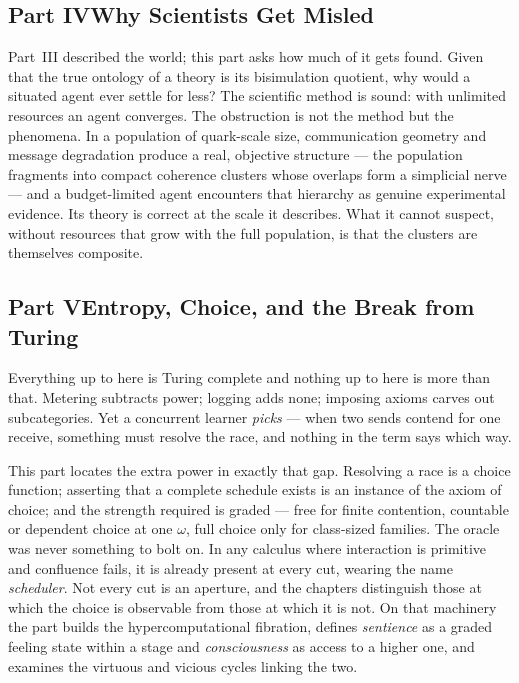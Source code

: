 \documentclass[12pt,openright,twoside]{book}
\theoremstyle{remark}
\theoremstyle{plain}
\theoremstyle{remark}
\theoremstyle{plain}
\theoremstyle{plain}
\begin{document}
\subsection*{Part IV\quad Why Scientists Get Misled}

Part~III described the world; this part asks how much of it gets found.
Given that the true ontology of a theory is its bisimulation quotient,
why would a situated agent ever settle for less?
The scientific method is sound: with unlimited resources an agent
converges.
The obstruction is not the method but the phenomena.
In a population of quark-scale size, communication geometry and message
degradation produce a real, objective structure --- the population
fragments into compact coherence clusters whose overlaps form a
simplicial nerve --- and a budget-limited agent encounters that hierarchy
as genuine experimental evidence.
Its theory is correct at the scale it describes.
What it cannot suspect, without resources that grow with the full
population, is that the clusters are themselves composite.

\subsection*{Part V\quad Entropy, Choice, and the Break from Turing}

Everything up to here is Turing complete and nothing up to here is more
than that.
Metering subtracts power; logging adds none; imposing axioms carves out
subcategories.
Yet a concurrent learner \emph{picks} --- when two sends contend for one
receive, something must resolve the race, and nothing in the term says
which way.

This part locates the extra power in exactly that gap.
Resolving a race is a choice function; asserting that a complete schedule
exists is an instance of the axiom of choice; and the strength required
is graded --- free for finite contention, countable or dependent choice
at one $\omega$, full choice only for class-sized families.
The oracle was never something to bolt on.
In any calculus where interaction is primitive and confluence fails, it
is already present at every cut, wearing the name \emph{scheduler}.
Not every cut is an aperture, and the chapters distinguish those at which
the choice is observable from those at which it is not.
On that machinery the part builds the hypercomputational fibration,
defines \emph{sentience} as a graded feeling state within a stage and
\emph{consciousness} as access to a higher one, and examines the virtuous
and vicious cycles linking the two.
\end{document}
